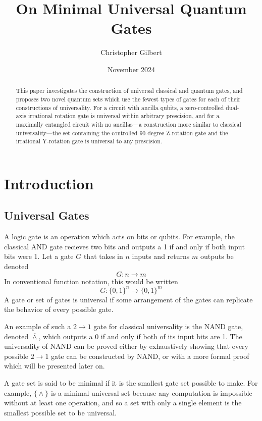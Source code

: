 \documentclass[12pt]{article}
\title{On Minimal Universal Quantum Gates}
\author{Christopher Gilbert}
\date{November 2024}
\newcommand{\nand}{\overline{\land}}
\begin{document}
\maketitle
\newpage

\begin{abstract}
This paper investigates the construction of universal classical and quantum gates, and proposes two novel quantum sets which use the fewest types of gates for each of their constructions of universality. For a circuit with ancilla qubits, a zero-controlled dual-axis irrational rotation gate is universal within arbitrary prescision, and for a maximally entangled circuit with no ancillas—a construction more similar to classical universality—the set containing the controlled 90-degree Z-rotation gate and the irrational Y-rotation gate is universal to any prescision.
\end{abstract}
\newpage

\section{Introduction}

\subsection{Universal Gates}
A logic gate is an operation which acts on bits or qubits. For example, the classical AND gate recieves two bits and outputs a 1 if and only if both input bits were 1. Let a gate $G$ that takes in $n$ inputs and returns $m$ outputs be denoted
$$G : n \to m$$
In conventional function notation, this would be written
$$G : \{0, 1\}^n \to \{0, 1\}^m$$
A gate or set of gates is universal if some arrangement of the gates can replicate the behavior of every possible gate.

An example of such a $2 \to 1$ gate for classical universality is the NAND gate, denoted $\nand$, which outputs a 0 if and only if both of its input bits are 1. The universality of NAND can be proved either by exhaustively showing that every possible $2 \to 1$ gate can be constructed by NAND, or with a more formal proof which will be presented later on.

A gate set is said to be minimal if it is the smallest gate set possible to make. For example, $\{ \nand \}$ is a minimal universal set because any computation is impossible without at least one operation, and so a set with only a single element is the smallest possible set to be universal.
\end{document}
